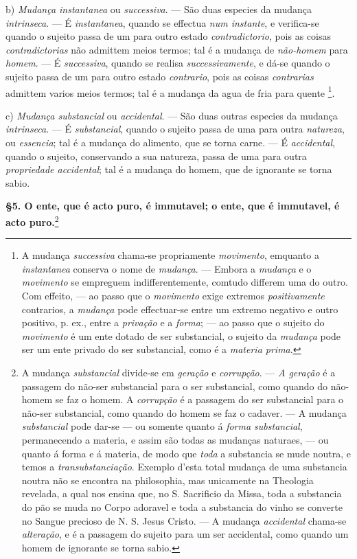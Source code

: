  b) \emph{Mudança instantanea} ou \emph{successiva}. --- São duas especies da mudança \emph{intrinseca}. --- É \emph{instantanea}, quando se effectua \emph{num instante}, e verifica-se quando o sujeito passa de um para outro estado \emph{contradictorio}, pois as coisas \emph{contradictorias} não admittem meios termos; tal é a mudança de \emph{não-homem} para \emph{homem}. --- É \emph{successiva}, quando se realisa \emph{successivamente}, e dá-se quando o sujeito passa de um para outro estado \emph{contrario}, pois as coisas \emph{contrarias} admittem varios meios termos; tal é a mudança da agua de fria para quente \footnote{A mudança \emph{successiva} chama-se propriamente \emph{movimento}, emquanto a \emph{instantanea} conserva o nome de \emph{mudança}. --- Embora a \emph{mudança} e o \emph{movimento} se empreguem indifferentemente, comtudo differem uma do outro. Com effeito, --- ao passo que o \emph{movimento} exige extremos \emph{positivamente} contrarios, a \emph{mudança} pode effectuar-se entre um extremo negativo e outro positivo, p. ex., entre a \emph{privação} e a \emph{forma}; --- ao passo que o sujeito do \emph{movimento} é um ente dotado de ser substancial, o sujeito da \emph{mudança} pode ser um ente privado do ser substancial, como é a \emph{materia prima}.}.

c) \emph{Mudança substancial} ou \emph{accidental}. --- São duas outras especies da mudança \emph{intrinseca}. --- É \emph{substancial}, quando o sujeito passa de uma para outra \emph{natureza}, ou \emph{essencia}; tal é a mudança do alimento, que se torna carne. --- É \emph{accidental}, quando o sujeito, conservando a sua natureza, passa de uma para outra \emph{propriedade accidental}; tal é a mudança do homem, que de ignorante se torna sabio.

\textbf{§5. O ente, que é acto puro, é immutavel; o ente, que é immutavel, é acto puro.}\footnote{A mudança \emph{substancial} divide-se em \emph{geração} e \emph{corrupção}. --- \emph{A geração} é a passagem do não-ser substancial para o ser substancial, como quando do não-homem se faz o homem. A \emph{corrupção} é a passagem do ser substancial para o não-ser substancial, como quando do homem se faz o cadaver. --- A mudança \emph{substancial} pode dar-se --- ou somente quanto á \emph{forma substancial}, permanecendo a materia, e assim são todas as mudanças naturaes, --- ou quanto á forma e á materia, de modo que \emph{toda} a substancia se mude noutra, e temos a \emph{transubstanciação}. Exemplo d'esta total mudança de uma substancia noutra não se encontra na philosophia, mas unicamente na Theologia revelada, a qual nos ensina que, no S. Sacrificio da Missa, toda a substancia do pão se muda no Corpo adoravel e toda a substancia do vinho se converte no Sangue precioso de N. S. Jesus Cristo. --- A mudança \emph{accidental} chama-se \emph{alteração}, e é a passagem do sujeito para um ser accidental, como quando um homem de ignorante se torna sabio.}
